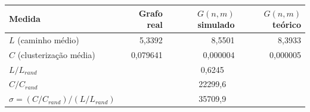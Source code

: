 \begin{tabular}{lrrr}
    \toprule
    Medida & Grafo real & $G(n,m)$ simulado & $G(n,m)$ teórico \\
    \midrule
    $L$ (caminho médio) & 5,3392 & 8,5501 & 8,3933 \\
    $C$ (clusterização média) & 0,079641 & 0,000004 & 0,000005 \\
    $L/L_{rand}$ & \multicolumn{3}{c}{0,6245} \\
    $C/C_{rand}$ & \multicolumn{3}{c}{22299,6} \\
    $\sigma=(C/C_{rand})/(L/L_{rand})$ & \multicolumn{3}{c}{35709,9} \\
    \bottomrule
\end{tabular}
